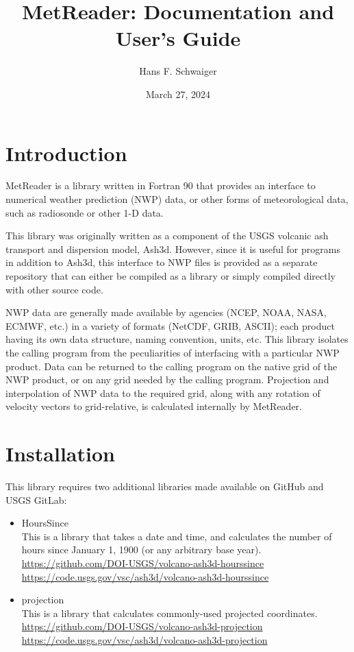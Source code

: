 \documentclass[11pt]{article}   %
\begin{document}
\title{MetReader: Documentation and User's Guide}   %
\author{Hans F. Schwaiger}
\date{March 27, 2024}    %
\maketitle

\section{Introduction}
MetReader is a library written in Fortran 90 that provides an interface to
numerical weather prediction (NWP) data, or other forms of meteorological
data, such as radiosonde or other 1-D data.

This library was originally written as a component of the USGS volcanic ash
transport and dispersion model, Ash3d.  However, since it is useful for
programs in addition to Ash3d, this interface to NWP files is provided
as a separate repository that can either be compiled as a library or simply
compiled directly with other source code.

NWP data are generally made available by agencies (NCEP, NOAA, NASA, ECMWF, etc.)
in a variety of formats (NetCDF, GRIB, ASCII); each product having
its own data structure, naming convention, units, etc.  This library
isolates the calling program from the peculiarities of interfacing with
a particular NWP product.  Data can be returned to the calling program on
the native grid of the NWP product, or on any grid needed by the calling
program.  Projection and interpolation of NWP data to the required grid, along
with any rotation of velocity vectors to grid-relative, is calculated internally by
MetReader.

\section{Installation}
This library requires two additional libraries made available on GitHub and USGS GitLab:
\begin{itemize}
\item HoursSince \\
This is a library that takes a date and time, and calculates the number of hours
since January 1, 1900 (or any arbitrary base year).\\
\url{https://github.com/DOI-USGS/volcano-ash3d-hourssince}\\
\url{https://code.usgs.gov/vsc/ash3d/volcano-ash3d-hourssince}
\item projection \\
This is a library that calculates commonly-used projected coordinates.\\
\url{https://github.com/DOI-USGS/volcano-ash3d-projection}\\
\url{https://code.usgs.gov/vsc/ash3d/volcano-ash3d-projection}
\end{itemize}
\end{document}
